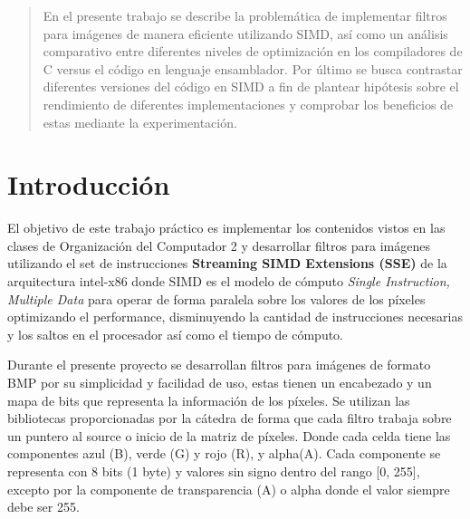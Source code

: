 \documentclass[a4paper]{article}
\begin{document}
\thispagestyle{empty}

\maketitle
\newpage

\thispagestyle{empty}
\vfill
\begin{abstract}

En el presente trabajo se describe la problemática de implementar filtros para imágenes de manera eficiente utilizando SIMD, así como un análisis comparativo entre diferentes niveles de optimización en los compiladores de C versus el código en lenguaje ensamblador. Por último se busca contrastar diferentes versiones del código en SIMD a fin de plantear hipótesis sobre el rendimiento de diferentes implementaciones  y comprobar los beneficios de estas mediante la experimentación.

\end{abstract}

\thispagestyle{empty}
\vspace{3cm}
\tableofcontents
\newpage


\newpage

\section{Introducción}

El objetivo de este trabajo práctico es implementar los contenidos vistos en las clases de Organización del Computador 2 y desarrollar filtros para imágenes utilizando el set de instrucciones \textbf{Streaming SIMD Extensions (SSE)} de la arquitectura intel-x86 donde SIMD es el modelo de cómputo \emph{Single Instruction, Multiple Data} para operar de forma paralela sobre los valores de los píxeles optimizando el performance, disminuyendo la cantidad de instrucciones necesarias y los saltos en el procesador así como el tiempo de cómputo. 

Durante el presente proyecto se desarrollan filtros para imágenes de formato BMP por su simplicidad y facilidad de uso, estas tienen un encabezado y un mapa de bits que representa la información de los píxeles. Se utilizan las bibliotecas proporcionadas por la cátedra de forma que cada filtro trabaja sobre un puntero al source o inicio de la matriz de píxeles. Donde cada celda tiene las componentes azul (B), verde (G) y rojo (R), y alpha(A). Cada componente se representa con 8 bits (1 byte) y valores sin signo dentro del rango [0, 255], excepto por la componente de transparencia (A) o alpha donde el valor siempre debe ser 255.
\end{document}
